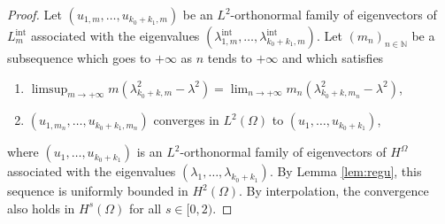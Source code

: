 \documentclass[10pt]{amsart}
\newcommand{\intt}{\mathrm{int}}
\theoremstyle{plain}
\theoremstyle{definition}
\newcommand{\NN}{\mathbb{N}}
\begin{document}
\begin{proof}
Let $(u_{1,m}, \dots,u_{k_0+k_1,m})$ be an $L^2$-orthonormal family of eigenvectors of $L^\intt_m$ associated with the eigenvalues $(\lambda^\intt_{1,m},\dots,\lambda^\intt_{k_0+k_1,m})$.
Let $(m_n)_{n\in \NN}$ be a subsequence which goes to $+\infty$ as $n$ tends to $+\infty$ and which satisfies
\begin{enumerate}
\item $\limsup_{m\to+\infty}m(\lambda_{k_0+k,m}^2-\lambda^2) = \lim_{n\to+\infty}m_n(\lambda_{k_0+k,m_n}^2-\lambda^2)$,
\item $(u_{1,m_n},\dots,u_{k_0+k_1,m_n})$ converges in $L^2(\Omega)$ to $(u_1,\dots,u_{k_0+k_1})$,
\end{enumerate}
where $(u_1,\dots,u_{k_0+k_1})$ is an $L^2$-orthonormal family of eigenvectors of $H^\Omega$ associated with the eigenvalues $(\lambda_1,\dots,\lambda_{k_0+k_1})$.
By Lemma \ref{lem:regu}, this sequence is uniformly bounded in $H^2(\Omega)$. By interpolation, the convergence also holds in $H^s(\Omega)$ for all $s\in[0,2)$.


\end{proof}
\end{document}
